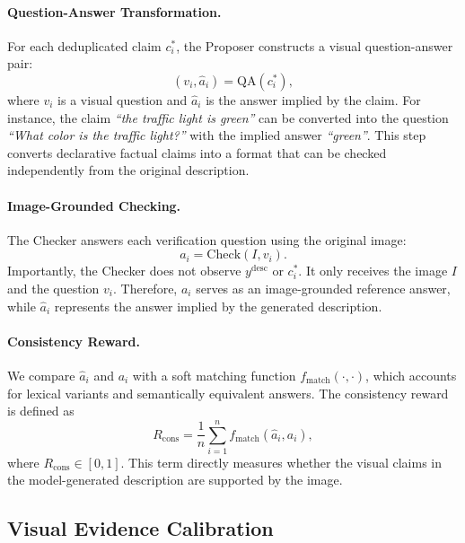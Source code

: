 \paragraph{Question-Answer Transformation.}
For each deduplicated claim $c_i^{\ast}$, the Proposer constructs a visual
question-answer pair:
\begin{equation}
    (v_i,\hat{a}_i)
    =
    \mathrm{QA}(c_i^{\ast}),
\end{equation}
where $v_i$ is a visual question and $\hat{a}_i$ is the answer implied by the
claim. For instance, the claim \textit{``the traffic light is green''} can be
converted into the question \textit{``What color is the traffic light?''} with
the implied answer \textit{``green''}. This step converts declarative factual
claims into a format that can be checked independently from the original
description.

\paragraph{Image-Grounded Checking.}
The Checker answers each verification question using the original image:
\begin{equation}
    a_i =
    \mathrm{Check}(I,v_i).
\end{equation}
Importantly, the Checker does not observe $y^{\mathrm{desc}}$ or $c_i^{\ast}$.
It only receives the image $I$ and the question $v_i$. Therefore, $a_i$ serves as
an image-grounded reference answer, while $\hat{a}_i$ represents the answer
implied by the generated description.

\paragraph{Consistency Reward.}
We compare $\hat{a}_i$ and $a_i$ with a soft matching function
$f_{\mathrm{match}}(\cdot,\cdot)$, which accounts for lexical variants and
semantically equivalent answers. The consistency reward is defined as
\begin{equation}
    R_{\mathrm{cons}}
    =
    \frac{1}{n}
    \sum_{i=1}^{n}
    f_{\mathrm{match}}(\hat{a}_i,a_i),
\end{equation}
where $R_{\mathrm{cons}}\in[0,1]$. This term directly measures whether the
visual claims in the model-generated description are supported by the image.

\subsection{Visual Evidence Calibration}
\label{sec:vec}

